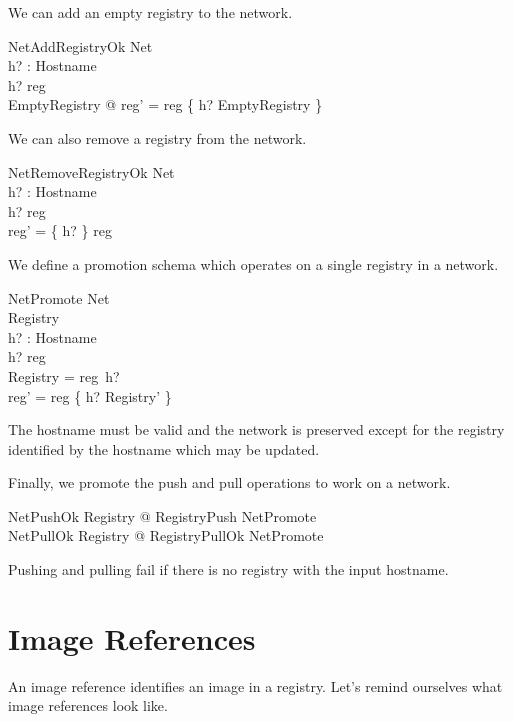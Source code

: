 \documentclass[a4paper,twoside,12pt]{article}
\begin{document}
We can add an empty registry to the network.
\begin{schema}{NetAddRegistryOk}
  \Delta Net \\
  h? : Hostname \\
\where
  h? \notin \dom reg \\
  \exists EmptyRegistry @ reg' = reg \cup \{ h? \mapsto \theta EmptyRegistry \} \\
\end{schema}

We can also remove a registry from the network.
\begin{schema}{NetRemoveRegistryOk}
  \Delta Net \\
  h? : Hostname \\
\where
  h? \in \dom reg \\
  reg' = \{ h? \} \ndres reg \\
\end{schema}

We define a promotion schema which operates on a single registry in a network.
\begin{schema}{NetPromote}
  \Delta Net \\
  \Delta Registry \\
  h? : Hostname \\
\where
  h? \in \dom reg \\
  \theta Registry = reg~h? \\
  reg' = reg \oplus \{ h? \mapsto \theta Registry' \} \\
\end{schema}
The hostname must be valid and the network is preserved except for the registry identified by the hostname which may be updated.

Finally, we promote the push and pull operations to work on a network.
\begin{zed}
  NetPushOk  \exists \Delta Registry @ RegistryPush \land NetPromote \\
  NetPullOk  \exists \Delta Registry @ RegistryPullOk \land NetPromote
\end{zed}
Pushing and pulling fail if there is no registry with the input hostname.

\newpage
\section{Image References}

An image reference identifies an image in a registry. Let's remind ourselves what image references look like.
\end{document}
